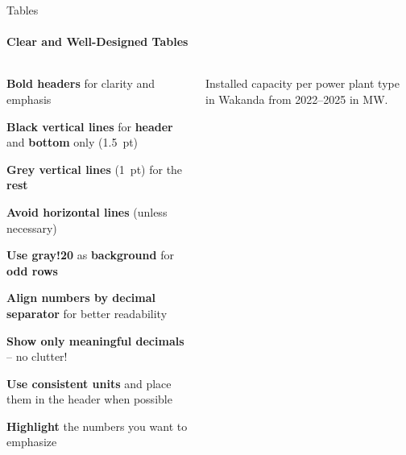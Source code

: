 \documentclass[aspectratio=169]{beamer}
\begin{document}
\begin{frame}{Tables}
    \framesubtitle{Clear and Well-Designed Tables}

    \vspace{-0.7cm}
    \begin{columns}
        \begin{column}{0.49\textwidth}
            \begin{coloredblock}
                \vspace{0.2cm}
                \begin{tugitemize}
                    \item \footnotesize \textbf{Bold headers} for clarity and emphasis
                    \item \textbf{Black vertical lines} for \textbf{header} and \textbf{bottom} only (1.5~pt) 
                    \item \textbf{Grey vertical lines} (1~pt) for the \textbf{rest}
                    \item \footnotesize \textbf{Avoid horizontal lines} (unless necessary)
                    \item \footnotesize \textbf{Use gray!20} as \textbf{background} for \textbf{odd rows}
                \end{tugitemize}
            \end{coloredblock}
            \vspace{0.2cm}
            \begin{coloredblock}
                \vspace{0.2cm}
                \begin{tugitemize}
                    \item \footnotesize \textbf{Align numbers by decimal separator} for better readability
                    \item \footnotesize \textbf{Show only meaningful decimals} – no clutter!
                    \item \footnotesize \textbf{Use consistent units} and place them in the header when possible
                    \item \footnotesize \textbf{Highlight} the numbers you want to emphasize
                \end{tugitemize}
            \end{coloredblock}
        \end{column}
        \begin{column}{0.49\textwidth}
            \vspace{2cm}            
            \begin{table}[htbp]
                
                \caption{\centering Installed capacity per power plant type in Wakanda from 2022--2025 in MW.}
            \end{table}
        \end{column}
    \end{columns}


\end{frame}
\end{document}
